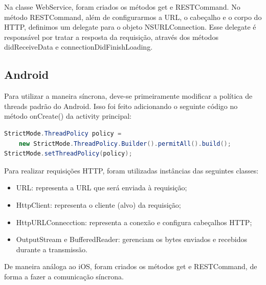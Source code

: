     Na classe WebService, foram criados os métodos get e RESTCommand. No método RESTCommand, além de configurarmos a \ac{URL}, o cabeçalho e o corpo do \ac{HTTP}, definimos um delegate para o objeto NSURLConnection. Esse delegate é responsável por tratar a resposta da requisição, através dos métodos didReceiveData e connectionDidFinishLoading.
     
     
    \subsection{Android}
     
            Para utilizar a maneira síncrona, deve-se primeiramente modificar a política de threads padrão do Android. Isso foi feito adicionando o seguinte código no método onCreate() da activity principal:
\begin{lstlisting}[language=Java]              
StrictMode.ThreadPolicy policy = 
    new StrictMode.ThreadPolicy.Builder().permitAll().build();
StrictMode.setThreadPolicy(policy);
 \end{lstlisting}       
    
	Para realizar requisições \ac{HTTP}, foram utilizadas instâncias das seguintes classes:
\begin{itemize}
\item URL: representa a \ac{URL} que será enviada à requisição;
\item HttpClient: representa o cliente (alvo) da requisição;
\item HttpURLConnecction: representa a conexão e configura cabeçalhos \ac{HTTP};
\item OutputStream e BufferedReader: gerenciam os bytes enviados e recebidos durante a transmissão.
\end{itemize}
    
	De maneira análoga ao iOS, foram criados os métodos get e RESTCommand, de forma a fazer a comunicação síncrona.

